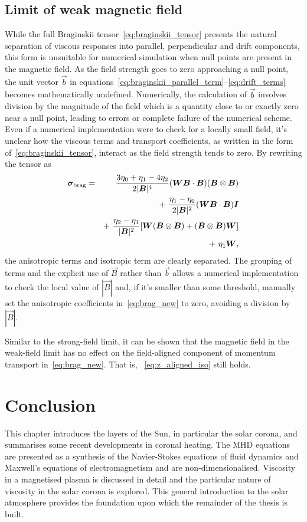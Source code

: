 \subsection{Limit of weak magnetic field}

While the full Braginskii tensor~\eqref{eq:braginskii_tensor} presents the natural separation of viscous responses into parallel, perpendicular and drift components, this form is unsuitable for numerical simulation when null points are present in the magnetic field. As the field strength goes to zero approaching a null point, the unit vector $\vec{b}$ in equations~\eqref{eq:braginskii_parallel_term}--\eqref{eq:drift_terms} becomes mathematically undefined. Numerically, the calculation of $\vec{b}$ involves division by the magnitude of the field which is a quantity close to or exactly zero near a null point, leading to errors or complete failure of the numerical scheme. Even if a numerical implementation were to check for a locally small field, it's unclear how the viscous terms and transport coefficients, as written in the form of~\eqref{eq:braginskii_tensor}, interact as the field strength tends to zero. By rewriting the tensor as
\begin{eqnarray}\label{eq:brag_new}
{\bm \sigma}_{\rm brag} = &&\frac{3\eta_0+\eta_1-4\eta_2}{2|{\bm B}|^4}({\bm W}{\bm B}\cdot{\bm B})({\bm B}\otimes{\bm B})\\
\nonumber
& &+~ \frac{\eta_1-\eta_0}{2|{\bm B}|^2}({\bm W}{\bm B}\cdot{\bm B}){\bm I}\\
\nonumber
& &+~ \frac{\eta_2-\eta_1}{|{\bm B}|^2}[{\bm W}({\bm B}\otimes{\bm B})+({\bm B}\otimes{\bm B}){\bm W}] \\
\nonumber
& &+~ \eta_1{\bm W},
\end{eqnarray}
the anisotropic terms and isotropic term are clearly separated. The grouping of terms and the explicit use of $\vec{B}$ rather than $\vec{b}$ allows a numerical implementation to check the local value of $|\vec{B}|$ and, if it's smaller than some threshold, manually set the anisotropic coefficients in~\eqref{eq:brag_new} to zero, avoiding a division by $|\vec{B}|$.

Similar to the strong-field limit, it can be shown that the magnetic field in the weak-field limit has no effect on the field-aligned component of momentum transport in~\eqref{eq:brag_new}. That is, ~\eqref{eq:z_aligned_iso} still holds.

\section{Conclusion}

This chapter introduces the layers of the Sun, in particular the solar corona, and summarises some recent developments in coronal heating. The MHD equations are presented as a synthesis of the Navier-Stokes equations of fluid dynamics and Maxwell's equations of electromagnetism and are non-dimensionalised. Viscosity in a magnetised plasma is discussed in detail and the particular nature of viscosity in the solar corona is explored. This general introduction to the solar atmosphere provides the foundation upon which the remainder of the thesis is built.
